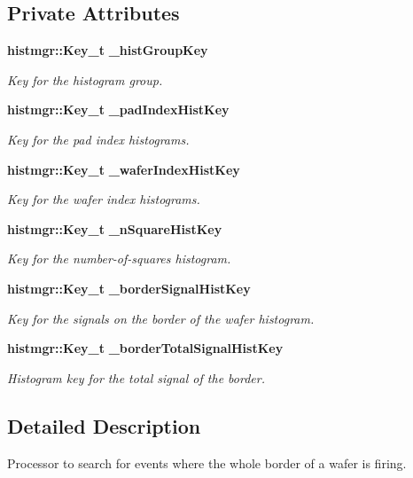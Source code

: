 \subsection*{Private Attributes}
\begin{DoxyCompactItemize}
\item 
{\bf histmgr\-::\-Key\-\_\-t} {\bf \-\_\-hist\-Group\-Key}
\begin{DoxyCompactList}\small\item\em Key for the histogram group. \end{DoxyCompactList}\item 
{\bf histmgr\-::\-Key\-\_\-t} {\bf \-\_\-pad\-Index\-Hist\-Key}
\begin{DoxyCompactList}\small\item\em Key for the pad index histograms. \end{DoxyCompactList}\item 
{\bf histmgr\-::\-Key\-\_\-t} {\bf \-\_\-wafer\-Index\-Hist\-Key}
\begin{DoxyCompactList}\small\item\em Key for the wafer index histograms. \end{DoxyCompactList}\item 
{\bf histmgr\-::\-Key\-\_\-t} {\bf \-\_\-n\-Square\-Hist\-Key}
\begin{DoxyCompactList}\small\item\em Key for the number-\/of-\/squares histogram. \end{DoxyCompactList}\item 
{\bf histmgr\-::\-Key\-\_\-t} {\bf \-\_\-border\-Signal\-Hist\-Key}
\begin{DoxyCompactList}\small\item\em Key for the signals on the border of the wafer histogram. \end{DoxyCompactList}\item 
{\bf histmgr\-::\-Key\-\_\-t} {\bf \-\_\-border\-Total\-Signal\-Hist\-Key}
\begin{DoxyCompactList}\small\item\em Histogram key for the total signal of the border. \end{DoxyCompactList}\end{DoxyCompactItemize}


\subsection{Detailed Description}
Processor to search for events where the whole border of a wafer is firing. 

